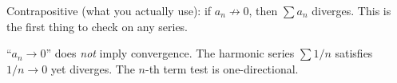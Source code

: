 \noindent Contrapositive (what you actually use): if $a_n \not\to 0$, then $\sum a_n$ diverges.
This is the first thing to check on any series.

\begin{pitfallbox}
``$a_n \to 0$'' does \emph{not} imply convergence. The harmonic series $\sum 1/n$ satisfies
$1/n \to 0$ yet diverges. The $n$-th term test is one-directional.
\end{pitfallbox}
